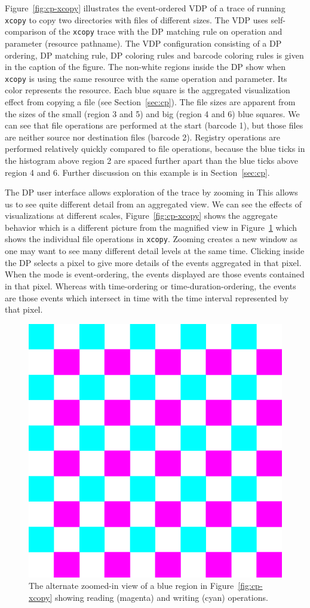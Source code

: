 
Figure~\ref{fig:cp-xcopy} illustrates the event-ordered VDP
of a trace of running
{\tt xcopy} to copy two directories with files of different sizes.
The VDP uses self-comparison of the {\tt xcopy} trace with
the DP matching rule on operation and parameter (resource pathname).
The VDP configuration consisting of a DP ordering, DP matching rule,
DP coloring rules and barcode coloring rules
is given in the caption of the figure.
The non-white regions inside the DP show when {\tt xcopy} is using the
same resource with the same operation and parameter.
Its color represents the resource.
Each blue square is the aggregated visualization effect from
copying a file (see Section~\ref{sec:cp}).
The file sizes are apparent from the sizes of the small (region 3 and 5)
and big (region 4 and 6) blue squares.
We can see that file operations are performed at the start (barcode 1),
but those files are neither source nor destination files (barcode 2).
Registry operations are performed relatively
quickly compared to file operations,
because the blue ticks in the histogram above region 2 are spaced further apart
than the blue ticks above region 4 and 6.
Further discussion on this example is in Section~\ref{sec:cp}.

The DP user interface allows exploration of the trace by zooming in
This allows us to see quite different detail from an aggregated view.
We can see the effects of visualizations at different scales,
Figure~\ref{fig:cp-xcopy} shows the aggregate behavior which
is a different picture from the magnified view in
Figure~\ref{fig:cp-zoom} which shows the individual file operations in {\tt xcopy}.
Zooming creates a new window as one may want to see many different
detail levels at the same time. Clicking inside the DP selects
a pixel to give more details of the events aggregated in that pixel. When
the mode is event-ordering, the events displayed are those events contained
in that pixel. Whereas with time-ordering or time-duration-ordering,
the events are those events which intersect in time with the time interval
represented by that pixel.

\begin{figure}[htb]
\begin{center}
\includegraphics[width=0.10\columnwidth]{lviz/cp-zoom.png}
\caption{The alternate zoomed-in view of a blue region in
Figure~\ref{fig:cp-xcopy} showing reading (magenta) and writing (cyan) operations.
}
\label{fig:cp-zoom}
\end{center}
\end{figure}

